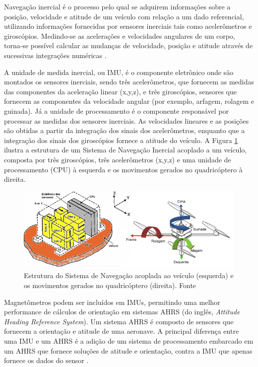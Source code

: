 \documentclass[a4paper, 12pt]{article}
\begin{document}
Navegação inercial é o processo pelo qual se adquirem informações sobre a posição, velocidade e atitude de um veículo com relação a um dado referencial, utilizando informações fornecidas por sensores inerciais tais como acelerômetros e giroscópios. Medindo-se as acelerações e velocidades angulares de um corpo, torna-se possível calcular as mudanças de velocidade, posição e atitude através de sucessivas integrações numéricas \cite{Adalberto2009}.

A unidade de medida inercial, ou IMU, é o componente eletrônico onde são montados os sensores inerciais, sendo três acelerômetros, que fornecem as medidas das componentes da aceleração linear (x,y,z), e três giroscópios, sensores que fornecem as componentes da velocidade angular (por exemplo, arfagem, rolagem e guinada). Já a unidade de processamento é o componente responsável por processar as medidas dos sensores inerciais. As velocidades lineares e as posições são obtidas a partir da integração dos sinais dos acelerômetros, enquanto que a integração dos sinais dos giroscópios fornece a atitude do veículo.  A Figura \ref{fig:imuStrap} ilustra a estrutura de um Sistema de Navegação Inercial acoplado a um veículo, composta por três giroscópios, três acelerômetros (x,y,z) e uma unidade de processamento (CPU) à esquerda e os movimentos gerados no quadricóptero à direita.

\begin{figure}[h]
	\centering
		\includegraphics[scale=0.6]{img/imuStrap.png}
	\caption{Estrutura do Sistema de Navegação acoplada ao veículo (esquerda) e os movimentos gerados no quadricóptero (direita). Fonte \cite{Adalberto2009}}
	\label{fig:imuStrap}
\end{figure}

Magnetômetros podem ser incluídos em IMUs, permitindo uma melhor performance de cálculos de orientação em sistemas AHRS (do inglês, \textit{Attitude Heading Reference System}). Um sistema AHRS é composto de sensores que fornecem a orientação e atitude de uma aeronave. A principal diferença entre uma IMU e um AHRS é a adição de um sistema de processamento embarcado em um AHRS que fornece soluções de atitude e orientação, contra a IMU que apenas fornece os dados do sensor \cite{Angonese2013}.
\end{document}
